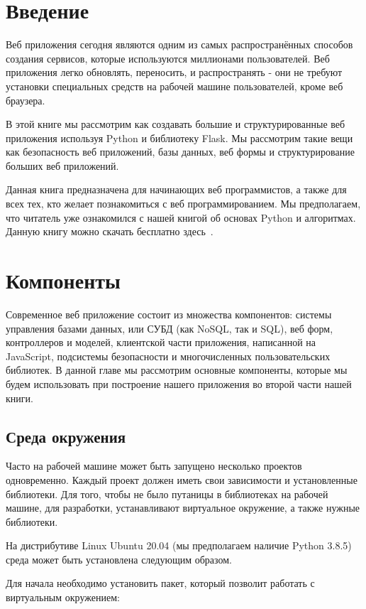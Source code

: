 \chapter*{Введение}
Веб приложения сегодня являются одним из самых распространённых
способов создания сервисов, которые используются миллионами 
пользователей. Веб приложения легко обновлять, переносить, и 
распространять - они не требуют установки специальных средств 
на рабочей машине пользователей, кроме веб браузера.

В этой книге мы рассмотрим как создавать большие и структурированные
веб приложения используя Python и библиотеку Flask. Мы рассмотрим
такие вещи как безопасность веб приложений, базы данных, веб формы
и структурирование больших веб приложений.

Данная книга предназначена для начинающих веб программистов, а также
для всех тех, кто желает познакомиться с веб программированием. Мы предполагаем,
что читатель уже ознакомился с нашей книгой об основах Python и алгоритмах.
Данную книгу можно скачать бесплатно здесь~\cite{kuptsov:python}.

\chapter{Компоненты}

Современное веб приложение состоит из множества компонентов: системы управления
базами данных, или СУБД (как NoSQL, так и SQL), веб форм, контроллеров и моделей,
клиентской части приложения, написанной на JavaScript, подсистемы безопасности и 
многочисленных пользовательских библиотек. В данной главе мы рассмотрим основные 
компоненты, которые мы будем использовать при построение нашего приложения во 
второй части нашей книги.

\section{Среда окружения}

Часто на рабочей машине может быть запущено несколько проектов 
одновременно. Каждый проект должен иметь свои зависимости и установленные
библиотеки. Для того, чтобы не было путаницы в библиотеках
на рабочей машине, для разработки, устанавливают виртуальное окружение, а 
также нужные библиотеки.

На дистрибутиве Linux Ubuntu 20.04 (мы предполагаем наличие Python 3.8.5)
среда может быть установлена следующим образом.

Для начала необходимо установить пакет, который позволит работать с виртуальным
окружением:

